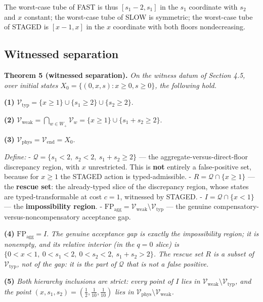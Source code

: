 \documentclass[review,11pt]{elsarticle}
\begin{document}
The worst-case tube of FAST is thus \([s_1 - 2, s_1]\) in the \(s_1\)
coordinate with \(s_2\) and \(x\) constant; the worst-case tube of SLOW
is symmetric; the worst-case tube of STAGED is \([x - 1, x]\) in the
\(x\) coordinate with both floors nondecreasing.

\subsection{Witnessed separation}\label{witnessed-separation}

\textbf{Theorem 5 (witnessed separation).} \emph{On the witness datum of
Section 4.5, over initial states
\(X_0 = \{(0, x, s) : x \ge 0, s \ge 0\}\), the following hold.}

\textbf{(1)}
\(\mathcal{V}_{\mathrm{typ}} = \{ x \ge 1 \} \cup \{ s_1 \ge 2 \} \cup \{ s_2 \ge 2 \}.\)

\textbf{(2)}
\(\mathcal{V}_{\mathrm{weak}} = \bigcap_{w \in W_+} \mathcal{V}_w = \{ x \ge 1 \} \cup \{ s_1 + s_2 \ge 2 \}.\)

\textbf{(3)}
\(\mathcal{V}_{\mathrm{phys}} = \mathcal{V}_{\mathrm{end}} = X_0.\)

\emph{Define:} -
\(\mathcal{Q} = \{ s_1 < 2,\ s_2 < 2,\ s_1 + s_2 \ge 2 \}\) --- the
aggregate-versus-direct-floor discrepancy region, with \(x\)
unrestricted. This is \textbf{not} entirely a false-positive set,
because for \(x \ge 1\) the STAGED action is typed-admissible. -
\(R = \mathcal{Q} \cap \{ x \ge 1 \}\) --- the \textbf{rescue set}: the
already-typed slice of the discrepancy region, whose states are typed-transformable at cost \(c = 1\), witnessed by STAGED. -
\(I = \mathcal{Q} \cap \{ x < 1 \}\) --- the \textbf{impossibility
region}. -
\(\mathrm{FP}_{\mathrm{agg}} = \mathcal{V}_{\mathrm{weak}} \setminus \mathcal{V}_{\mathrm{typ}}\)
--- the genuine compensatory-versus-noncompensatory acceptance gap.

\textbf{(4)} \(\mathrm{FP}_{\mathrm{agg}} = I.\) \emph{The genuine
acceptance gap is exactly the impossibility region; it is nonempty, and
its relative interior (in the \(q = 0\) slice) is
\(\{ 0 < x < 1,\ 0 < s_1 < 2,\ 0 < s_2 < 2,\ s_1 + s_2 > 2 \}\). The
rescue set \(R\) is a subset of \(\mathcal{V}_{\mathrm{typ}}\), not of
the gap: it is the part of \(\mathcal{Q}\) that is not a false
positive.}

\textbf{(5)} \emph{Both hierarchy inclusions are strict: every point of
\(I\) lies in
\(\mathcal{V}_{\mathrm{weak}} \setminus \mathcal{V}_{\mathrm{typ}}\),
and the point \((x, s_1, s_2) = (\tfrac12, \tfrac1{10}, \tfrac1{10})\)
lies in
\(\mathcal{V}_{\mathrm{phys}} \setminus \mathcal{V}_{\mathrm{weak}}\).}
\end{document}
